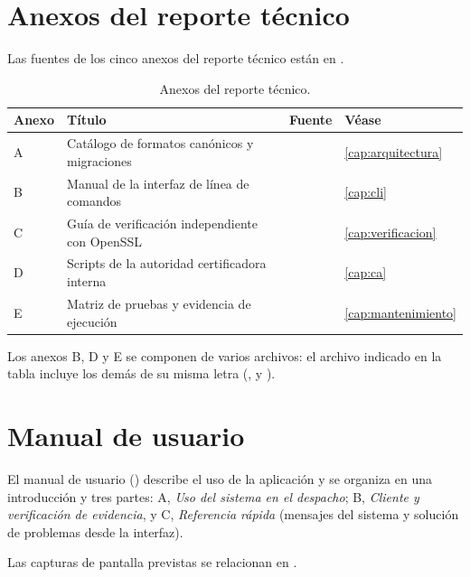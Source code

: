 \section{Anexos del reporte técnico}\label{sec:mapa-anexos}

Las fuentes de los cinco anexos del reporte técnico están en
.

\begin{table}[H]
  \centering
  \caption{Anexos del reporte técnico.}\label{tab:mapa-anexos}
  \begin{tabularx}{\textwidth}{C{1.2cm} Y L{5.4cm} L{2.2cm}}
    \toprule
    \textbf{Anexo} & \textbf{Título} & \textbf{Fuente} & \textbf{Véase} \\
    \midrule
    A & Catálogo de formatos canónicos y migraciones
      &  & \cref{cap:arquitectura} \\
    B & Manual de la interfaz de línea de comandos
      &  & \cref{cap:cli} \\
    C & Guía de verificación independiente con OpenSSL
      &  & \cref{cap:verificacion} \\
    D & Scripts de la autoridad certificadora interna
      &  & \cref{cap:ca} \\
    E & Matriz de pruebas y evidencia de ejecución
      &  & \cref{cap:mantenimiento} \\
    \bottomrule
  \end{tabularx}
\end{table}

Los anexos B, D y E se componen de varios archivos: el archivo indicado en la
tabla incluye los demás de su misma letra (,
 y ).

\section{Manual de usuario}\label{sec:mapa-usuario}

El manual de usuario () describe el uso de la
aplicación y se organiza en
una introducción y tres partes: A, \emph{Uso del sistema en el despacho};
B, \emph{Cliente y verificación de evidencia}, y C, \emph{Referencia rápida}
(mensajes del sistema y solución de problemas desde la interfaz).

Las capturas de pantalla previstas se relacionan en
.

